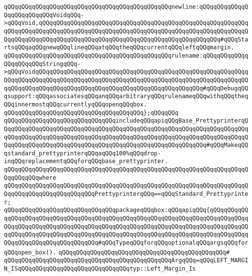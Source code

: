 \newline
\verb|qQQqqQQqqQQqqQQqqQQqqQQqqQQqqQQqqQQqqQQqqQQqqQQqnewline:qQQqqQQqqQQqqQQqqQQqqQQqqQQqVoidqQQq->qQQqVoid,qQQqqQQqqQQqqQQqqQQqqQQqqQQqqQQqqQQqqQQqqQQqqQQqqQQqqQQqqQQqqQQqqQQqqQQqqQQqqQQqqQQqqQQqqQQqqQQqqQQqqQQqqQQqqQQqqQQqqQQqqQQqqQQqqQQqqQQqqQQqqQQqqQQqqQQqqQQqqQQqqQQqqQQqqQQqqQQqqQQqqQQqqQQqqQQq#qQQqStartsqQQqaqQQqnewqQQqlineqQQqatqQQqtheqQQqcurrentqQQqleftqQQqmargin.|\newline
\newline
\verb|qQQqqQQqqQQqqQQqqQQqqQQqqQQqqQQqqQQqqQQqqQQqqQQqrulename:qQQqqQQqqQQqqQQqqQQqqQQqStringqQQq->qQQqVoidqQQqqQQqqQQqqQQqqQQqqQQqqQQqqQQqqQQqqQQqqQQqqQQqqQQqqQQqqQQqqQQqqQQqqQQqqQQqqQQqqQQqqQQqqQQqqQQqqQQqqQQqqQQqqQQqqQQqqQQqqQQqqQQqqQQqqQQqqQQqqQQqqQQqqQQqqQQqqQQqqQQqqQQqqQQqqQQqqQQqqQQqqQQq#qQQqDebugqQQqsupport:qQQqassociatesqQQqanqQQqarbitraryqQQqrulenameqQQqwithqQQqtheqQQqinnermostqQQqcurrentlyqQQqopenqQQqbox.|\newline
\verb|qQQqqQQqqQQqqQQqqQQqqQQqqQQqqQQqqQQqqQQq};qQQqqQQq|\newline
\newline
\verb|qQQqqQQqqQQqqQQqqQQqqQQqqQQqqQQqincludeqQQqapiqQQqBase_PrettyprinterqQQqqQQqqQQqqQQqqQQqqQQqqQQqqQQqqQQqqQQqqQQqqQQqqQQqqQQqqQQqqQQqqQQqqQQqqQQqqQQqqQQqqQQqqQQqqQQqqQQqqQQqqQQqqQQqqQQqqQQqqQQqqQQqqQQqqQQqqQQqqQQqqQQqqQQqqQQqqQQqqQQqqQQqqQQqqQQqqQQqqQQqqQQqqQQqqQQqqQQq#qQQqMakeqQQqstandard_prettyprinterqQQqaqQQq100%qQQqdrop-inqQQqreplacementqQQqforqQQqbase_prettyprinter.|\newline
\verb|qQQqqQQqqQQqqQQqqQQqqQQqqQQqqQQqqQQqqQQqqQQqqQQqqQQqqQQqqQQqqQQqqQQqqQQqqQQqqQQqwhere|\newline
\verb|qQQqqQQqqQQqqQQqqQQqqQQqqQQqqQQqqQQqqQQqqQQqqQQqqQQqqQQqqQQqqQQqqQQqqQQqqQQqqQQqqQQqqQQqqQQqqQQqPrettyprinterqQQq==qQQqStandard_Prettyprinter;|\newline
\newline
\verb|qQQqqQQqqQQqqQQqqQQqqQQqqQQqqQQqpackageqQQqbox:qQQqapiqQQq{qQQqqQQqqQQqqQQqqQQqqQQqqQQqqQQqqQQqqQQqqQQqqQQqqQQqqQQqqQQqqQQqqQQqqQQqqQQqqQQqqQQqqQQqqQQqqQQqqQQqqQQqqQQqqQQqqQQqqQQqqQQqqQQqqQQqqQQqqQQqqQQqqQQqqQQqqQQqqQQqqQQqqQQqqQQqqQQqqQQqqQQqqQQqqQQqqQQqqQQqqQQqqQQqqQQqqQQqqQQqqQQqqQQqqQQqqQQqqQQqqQQqqQQq#qQQqTypeqQQqforqQQqoptionalqQQqargsqQQqforqQQqopen_box().|\newline
\verb|qQQqqQQqqQQqqQQqqQQqqQQqqQQqqQQqqQQqqQQqqQQqqQQq#|\newline
\verb|qQQqqQQqqQQqqQQqqQQqqQQqqQQqqQQqqQQqqQQqqQQqqQQqArgqQQq=qQQqLEFT_MARGIN_ISqQQqqQQqqQQqqQQqqQQqqQQqqQQqqQQqtyp::Left_Margin_Is|\newline
